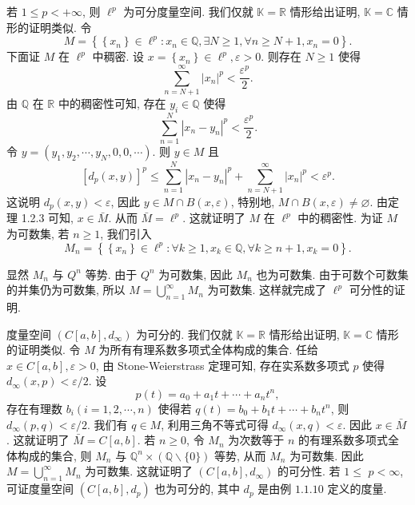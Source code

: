 \documentclass[openany]{ctexbook}
\theoremstyle{kaiti}
\theoremstyle{normal}
\begin{document}
若 $1 \leqslant p<+\infty$, 则 $\ell^{p}$ 为可分度量空间. 我们仅就 $\mathbb{K}=\mathbb{R}$ 情形给出证明, $\mathbb{K}=\mathbb{C}$ 情形的证明类似. 令
$$
M=\left\{\left\{x_n\right\} \in \ell^{p}: x_n \in \mathbb{Q}, \exists N \geqslant 1, \forall n \geqslant N+1, x_n=0\right\}.
$$
下面证 $M$ 在 $\ell^{p}$ 中稠密. 设 $x=\left\{x_n\right\} \in \ell^{p}, \varepsilon>0$. 则存在 $N \geqslant 1$ 使得
$$
\sum_{n=N+1}^{\infty}\left|x_n\right|^{p}<\frac{\varepsilon^{p}}{2}.
$$
由 $\mathbb{Q}$ 在 $\mathbb{R}$ 中的稠密性可知, 存在 $y_{i} \in \mathbb{Q}$ 使得
$$
\sum_{n=1}^{N}\left|x_n-y_n\right|^{p}<\frac{\varepsilon^{p}}{2}.
$$
令 $y=\left(y_1, y_2, \cdots, y_{N}, 0,0, \cdots\right)$. 则 $y \in M$ 且
$$
\left[d_{p}(x, y)\right]^{p} \leqslant \sum_{n=1}^{N}\left|x_n-y_n\right|^{p}+\sum_{n=N+1}^{\infty}\left|x_n\right|^{p}<\varepsilon^{p}.
$$
这说明 $d_{p}(x, y)<\varepsilon$, 因此 $y \in M \cap B(x, \varepsilon)$, 特别地, $M \cap B(x, \varepsilon) \neq \varnothing$. 由定理 1.2.3 可知, $x \in \bar{M}$. 从而 $\bar{M}=\ell^{p}$. 这就证明了 $M$ 在 $\ell^{p}$ 中的稠密性. 为证 $M$ 为可数集, 若 $n \geqslant 1$, 我们引入
$$
M_n=\left\{\left\{x_n\right\} \in \ell^{p}: \forall k \geqslant 1, x_{k} \in \mathbb{Q}, \forall k \geqslant n+1, x_{k}=0\right\}.
$$

显然 $M_n$ 与 $Q^n$ 等势. 由于 $Q^n$ 为可数集, 因此 $M_n$ 也为可数集. 由于可数个可数集的并集仍为可数集, 所以 $M=\bigcup_{n=1}^{\infty} M_n$ 为可数集. 这样就完成了 $\ell^{p}$ 可分性的证明.

度量空间 $\left(C[a, b], d_{\infty}\right)$ 为可分的. 我们仅就 $\mathbb{K}=\mathbb{R}$ 情形给出证明, $\mathbb{K}=\mathbb{C}$ 情形的证明类似. 令 $M$ 为所有有理系数多项式全体构成的集合. 任给 $x \in C[a, b], \varepsilon>0$, 由 Stone-Weierstrass 定理可知, 存在实系数多项式 $p$ 使得 $d_{\infty}(x, p)<\varepsilon / 2$. 设
$$
p(t)=a_0+a_1 t+\cdots+a_n t^n,
$$
存在有理数 $b_{i}(i=1,2, \cdots, n)$ 使得若 $q(t)=b_0+b_1 t+\cdots+b_n t^n$, 则 $d_{\infty}(p, q)<\varepsilon / 2$. 我们有 $q \in M$, 利用三角不等式可得 $d_{\infty}(x, q)<\varepsilon$. 因此 $x \in \bar{M}$. 这就证明了 $\bar{M}=C[a, b]$. 若 $n \geqslant 0$, 令 $M_n$ 为次数等于 $n$ 的有理系数多项式全体构成的集合, 则 $M_n$ 与 $\mathbb{Q}^n \times(\mathbb{Q} \backslash\{0\})$ 等势, 从而 $M_n$ 为可数集. 因此 $M=\bigcup_{n=1}^{\infty} M_n$ 为可数集. 这就证明了 $\left(C[a, b], d_{\infty}\right)$ 的可分性. 若 $1 \leqslant$ $p<\infty$, 可证度量空间 $\left(C[a, b], d_{p}\right)$ 也为可分的, 其中 $d_{p}$ 是由例 $1.1.10$ 定义的度量.
\end{document}

